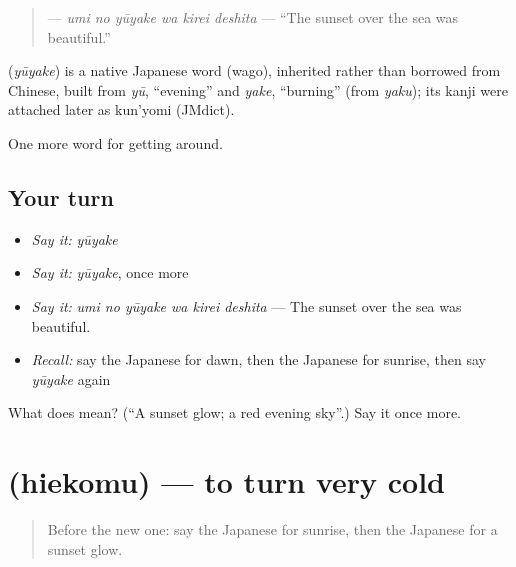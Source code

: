\begin{quote}
\textbf{  } — \emph{umi no yūyake wa kirei deshita} — \textquotedblleft{}The sunset over the sea was beautiful.\textquotedblright{}
\end{quote}

\begin{cousinweb}
\textbf{} (\emph{yūyake}) is a native Japanese word (wago), inherited rather than borrowed from Chinese, built from \emph{yū}, \textquotedblleft{}evening\textquotedblright{} and \emph{yake}, \textquotedblleft{}burning\textquotedblright{} (from \emph{yaku}); its kanji were attached later as kun'yomi (JMdict).
\end{cousinweb}

\begin{grammarlens}[title={What you've built}]
One more word for getting around.
\end{grammarlens}

\subsection*{Your turn}
\begin{itemize}
\raggedright
  \item \emph{Say it:} \emph{yūyake}
  \item \emph{Say it:} \emph{yūyake}, once more
  \item \emph{Say it:} \emph{umi no yūyake wa kirei deshita} — The sunset over the sea was beautiful.
  \item \emph{Recall:} say the Japanese for dawn, then the Japanese for sunrise, then say \emph{yūyake} again
\end{itemize}

\begin{tcolorbox}[breakable,colback=teal!4,colframe=teal!35!black,title={Before you move on}]
What does  mean? (\textquotedblleft{}A sunset glow; a red evening sky\textquotedblright{}.) Say it once more.
\end{tcolorbox}
\section[\texorpdfstring{\ja{ひえこむ} (hiekomu)}{ひえこむ (hiekomu)}]{ (hiekomu) — to turn very cold}

\label{lesson:JA-C416-hiekomu}



\begin{quote}
Before the new one: say the Japanese for sunrise, then the Japanese for a sunset glow.
\end{quote}

